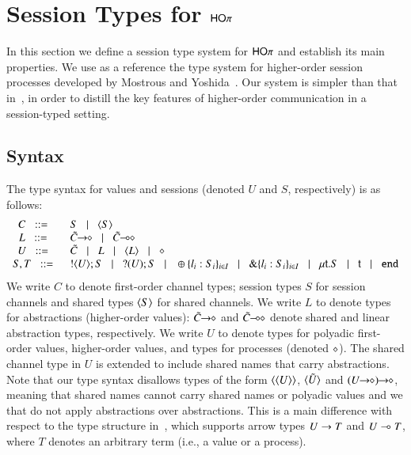 \newpage
\section{Session Types for $\mathsf{HO}\pi$}
\label{s:types}

In this section we define a session type system for
$\mathsf{HO}\pi$ and establish its main properties. We use as
a reference the type system for higher-order session processes 
developed by Mostrous and Yoshida~\cite{tlca07}.
Our system is simpler than that in~\cite{tlca07}, in order to distill the key
features of higher-order communication in a session-typed setting.


\subsection{Syntax}
The type syntax for values and sessions
(denoted $U$ and $S$, respectively) is as follows:
%
\[
\begin{array}{cl}
	C \bnfis &	S \bnfbar \chtype{S}
	\\

	L \bnfis &	\shot{\tilde{C}} \bnfbar \lhot{\tilde{C}}
	\\

	U \bnfis &	\tilde{C} \bnfbar L \bnfbar \chtype{L} \bnfbar \Proc
	\\

	S,T \bnfis & 	\btout{U} S \bnfbar \btinp{U} S
			\bnfbar \btsel{l_i:S_i}_{i \in I} \bnfbar \btbra{l_i:S_i}_{i \in I}
			\bnfbar \trec{t}{S} \bnfbar \vart{t}  \bnfbar \tinact
\end{array}
\]
%
\noi
We write $C$ to denote first-order channel types; session types $S$
for session channels and shared types $\langle S \rangle$ for shared channels.
We write $L$ to denote types for abstractions (higher-order values): %
$\tilde{C}\!\! \rightarrow\!\! \diamond$ and $\tilde{C}\!\! \multimap\!\! \diamond$ denote
shared and linear abstraction types, respectively.
We write $U$ to denote types for polyadic first-order values, higher-order values, and 
types for processes (denoted $\diamond$).
The shared channel type in $U$ is extended
to include shared names that carry abstractions.
Note that our type syntax disallows types of
the form $\langle \langle U \rangle \rangle$, $\langle \tilde{U} \rangle$
and $\shot{(\shot{U})}$,
meaning that shared names cannot carry shared names or
polyadic values and
we that do not apply abstractions over abstractions.
This is a main difference with respect to the type structure in~\cite{tlca07}, which 
supports arrow types 
$U \rightarrow T$ and 
$U \multimap T$, where $T$ denotes an arbitrary term (i.e., a value or a process).



